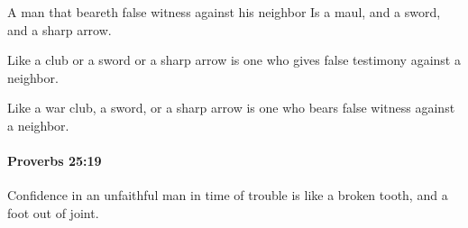 			\begin{versebox}
					\item[BHS] 
					\item[ASV] A man that beareth false witness against his neighbor Is a maul, and a sword, and a sharp arrow.
					\item[NIV] Like a club or a sword or a sharp arrow is one who gives false testimony against a neighbor.
					\item[NRSV] Like a war club, a sword, or a sharp arrow is one who bears false witness against a neighbor.
			\end{versebox}

		\paragraph{Proverbs 25:19} %
			\label{PROVERBS-25-19}

			Confidence in an unfaithful man in time of trouble is like a broken tooth, and a foot out of joint.

